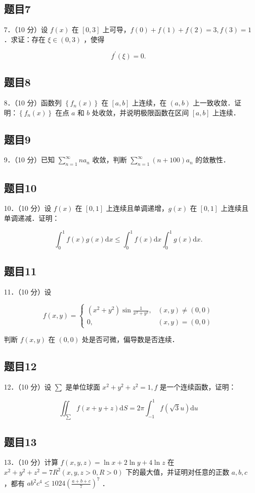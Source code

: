 \documentclass{article}
\begin{document}
\subsection{题目7}
7．（10 分）设 \(f(x)\) 在 \([0,3]\) 上可导，\(f(0)+f(1)+f(2)=3, f(3)=1\) ．求证：存在 \(\xi \in(0,3)\) ，使得

\[
f^{\prime}(\xi)=0 .
\]

\subsection{题目8}
8．（10 分）函数列 \(\left\{f_{n}(x)\right\}\) 在 \([a, b]\) 上连续，在 \((a, b)\) 上一致收敛．证明：\(\left\{f_{n}(x)\right\}\) 在点 \(a\) 和 \(b\) 处收敛，并说明极限函数在区间 \([a, b]\) 上连续．

\subsection{题目9}
9．（10 分）已知 \(\sum_{n=1}^{\infty} n a_{n}\) 收敛，判断 \(\sum_{n=1}^{\infty}(n+100) a_{n}\) 的敛散性．

\subsection{题目10}
10．（10 分）设 \(f(x)\) 在 \([0,1]\) 上连续且单调递增，\(g(x)\) 在 \([0,1]\) 上连续且单调递减．证明：

\[
\int_{0}^{1} f(x) g(x) \mathrm{d} x \leq \int_{0}^{1} f(x) \mathrm{d} x \int_{0}^{1} g(x) \mathrm{d} x .
\]

\subsection{题目11}
11．（10 分）设

\[
f(x, y)= \begin{cases}\left(x^{2}+y^{2}\right) \sin \frac{1}{x^{2}+y^{2}}, & (x, y) \neq(0,0) \\ 0, & (x, y)=(0,0)\end{cases}
\]

判断 \(f(x, y)\) 在 \((0,0)\) 处是否可微，偏导数是否连续．

\subsection{题目12}
12．（10 分）设 \(\sum\) 是单位球面 \(x^{2}+y^{2}+z^{2}=1, f\) 是一个连续函数，证明：

\[
\iint_{\sum} f(x+y+z) \mathrm{d} S=2 \pi \int_{-1}^{1} f(\sqrt{3} u) \mathrm{d} u
\]

\subsection{题目13}
13．（10 分）计算 \(f(x, y, z)=\ln x+2 \ln y+4 \ln z\) 在 \(x^{2}+y^{2}+z^{2}=7 R^{2}(x, y, z>0, R>0)\) 下的最大值，并证明对任意的正数 \(a, b, c\) ，都有 \(a b^{2} c^{4} \leq 1024\left(\frac{a+b+c}{7}\right)^{7}\) ．
\end{document}
